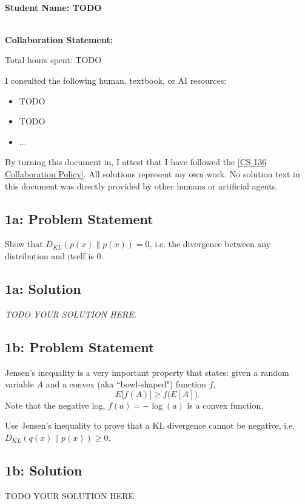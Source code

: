 \documentclass[10pt]{article}
\newcommand{\officialdirections}[1]{{\color{purple} #1}}
\begin{document}
~\\ %

{\Large{\bf Student Name: TODO}}

~\\ %
{\bf Collaboration Statement:}

Total hours spent: TODO

I consulted the following human, textbook, or AI resources:
\begin{itemize}
\item TODO
\item TODO
\item $\ldots$	
\end{itemize}

By turning this document in, I attest that I have followed the 
\href{https://www.cs.tufts.edu/cs/136/2026f/index.html#collaboration}{[CS 136 Collaboration Policy]}. All solutions represent my own work. No solution text in this document was directly provided by other humans or artificial agents. 

\tableofcontents

\newpage
\officialdirections{
\subsection*{1a: Problem Statement}
Show that $D_{KL}(p(x) \lVert p(x)) = 0$, i.e. the divergence between any distribution and itself is 0.
}

\subsection{1a: Solution}

\emph{TODO YOUR SOLUTION HERE.}


\newpage
\officialdirections{
\subsection*{1b: Problem Statement}
Jensen's inequality is a very important property that states: given a random variable $A$ and a convex (aka ``bowl-shaped") function $f$, 
$$E\big[f(A)\big] \geq f\big(E[A]\big).$$
Note that the negative log, $f(a) = -\log(a)$ is a convex function.

Use Jensen's inequality to prove that a KL divergence cannot be negative, i.e. $D_{KL}(q(x) \lVert p(x)) \geq 0$.
}

\subsection{1b: Solution}
TODO YOUR SOLUTION HERE
\end{document}
